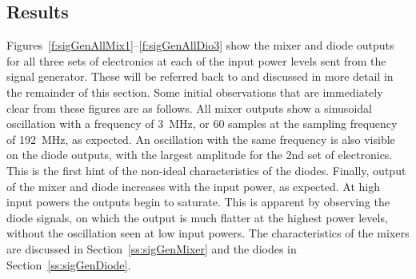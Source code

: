 \subsection{Results}
\label{ss:sigGenResults}

Figures~\ref{f:sigGenAllMix1}--\ref{f:sigGenAllDio3} show the mixer and diode outputs for all three sets of electronics at each of the input power levels sent from the signal generator. These will be referred back to and discussed in more detail in the remainder of this section. Some initial observations that are immediately clear from these figures are as follows. All mixer outputs show a sinusoidal oscillation with a frequency of 3~MHz, or 60 samples at the sampling frequency of 192~MHz, as expected. An oscillation with the same frequency is also visible on the diode outputs, with the largest amplitude for the 2nd set of electronics. This is the first hint of the non-ideal characteristics of the diodes. Finally, output of the mixer and diode increases with the input power, as expected. At high input powers the outputs begin to saturate. This is apparent by observing the diode signals, on which the output is much flatter at the highest power levels, without the oscillation seen at low input powers. The characteristics of the mixers are discussed in Section~\ref{ss:sigGenMixer} and the diodes in Section~\ref{ss:sigGenDiode}.

